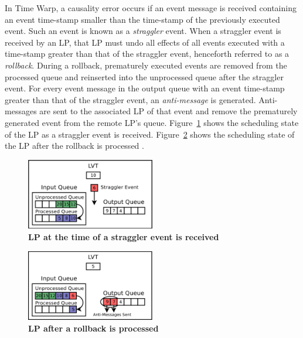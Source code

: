 \documentclass[11pt]{book}
\begin{document}
In Time Warp, a causality error occurs if an event message is received containing an event
time-stamp smaller than the time-stamp of the previously executed event.  Such an event is
known as a \emph{straggler} event.  When a straggler event is received by an LP, that LP
must undo all effects of all events executed with a time-stamp greater than that of the
straggler event, henceforth referred to as a \emph{rollback}.  During a rollback,
prematurely executed events are removed from the processed queue and reinserted into the
unprocessed queue after the straggler event.  For every event message in the output queue
with an event time-stamp greater than that of the straggler event, an \emph{anti-message}
is generated.  Anti-messages are sent to the associated LP of that event and remove the
prematurely generated event from the remote LP's queue.
Figure~\ref{fig:rollback_stragglerrecvd} shows the scheduling state of the LP as a
straggler event is received.  Figure~\ref{fig:rollback_processed} shows the scheduling
state of the LP after the rollback is processed \cite{dickman}.

\begin{figure}[H]
    \centering
    \graphicspath{ {./figures/} }
    \includegraphics[width=0.5\textwidth,keepaspectratio]{rollback_recv}
    \caption{\textbf{LP at the time of a straggler event is
        received}}\label{fig:rollback_stragglerrecvd}
\end{figure}

\begin{figure}[H]
    \centering
    \graphicspath{ {./figures/} }
    \includegraphics[width=0.5\textwidth,keepaspectratio]{rollback_processed}
    \caption{\textbf{LP after a rollback is processed}}\label{fig:rollback_processed}
\end{figure}
\end{document}
